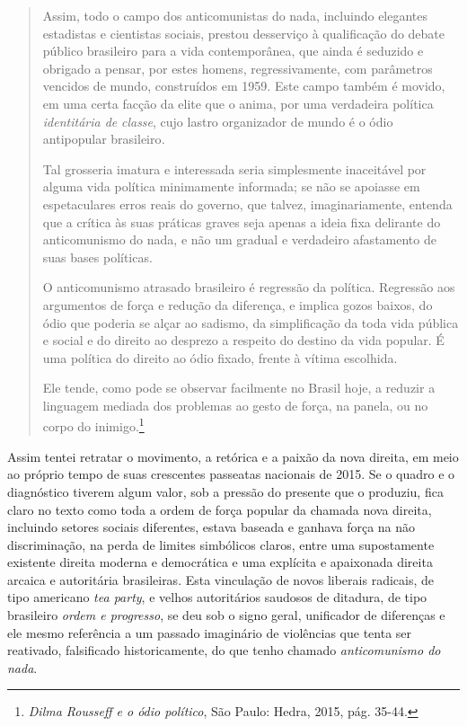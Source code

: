 \begin{quote}
Assim, todo o campo dos anticomunistas do nada, incluindo elegantes
estadistas e cientistas sociais, prestou desserviço à qualificação do
debate público brasileiro para a vida contemporânea, que ainda é
seduzido e obrigado a pensar, por estes homens, regressivamente, com
parâmetros vencidos de mundo, construídos em 1959. Este campo também é
movido, em uma certa facção da elite que o anima, por uma verdadeira
política \emph{identitária de} \emph{classe}, cujo lastro organizador de
mundo é o ódio antipopular brasileiro\emph{. }

Tal grosseria imatura e interessada seria simplesmente inaceitável por
alguma vida política minimamente informada; se não se apoiasse em
espetaculares erros reais do governo, que talvez, imaginariamente,
entenda que a crítica às suas práticas graves seja apenas a ideia fixa
delirante do anticomunismo do nada, e não um gradual e verdadeiro
afastamento de suas bases políticas.

O anticomunismo atrasado brasileiro é regressão da política. Regressão
aos argumentos de força e redução da diferença, e implica gozos baixos,
do ódio que poderia se alçar ao sadismo, da simplificação da toda vida
pública e social e do direito ao desprezo a respeito do destino da vida
popular. É uma política do direito ao ódio fixado, frente à vítima
escolhida.

Ele tende, como pode se observar facilmente no Brasil hoje, a reduzir a
linguagem mediada dos problemas ao gesto de força, na panela, ou no
corpo do inimigo.\footnote{\emph{Dilma Rousseff e o ódio político}, São
  Paulo: Hedra, 2015, pág. 35-44.}
  \end{quote}

Assim tentei retratar o movimento, a retórica e a paixão da nova
direita, em meio ao próprio tempo de suas crescentes passeatas nacionais
de 2015. Se o quadro e o diagnóstico tiverem algum valor, sob a pressão
do presente que o produziu, fica claro no texto como toda a ordem de
força popular da chamada nova direita, incluindo setores sociais
diferentes, estava baseada e ganhava força na não discriminação, na
perda de limites simbólicos claros, entre uma supostamente existente
direita moderna e democrática e uma explícita e apaixonada direita
arcaica e autoritária brasileiras. Esta vinculação de novos liberais
radicais, de tipo americano \emph{tea party}, e velhos autoritários
saudosos de ditadura, de tipo brasileiro \emph{ordem e progresso}, se
deu sob o signo geral, unificador de diferenças e ele mesmo referência a
um passado imaginário de violências que tenta ser reativado, falsificado
historicamente, do que tenho chamado \emph{anticomunismo do nada}.


